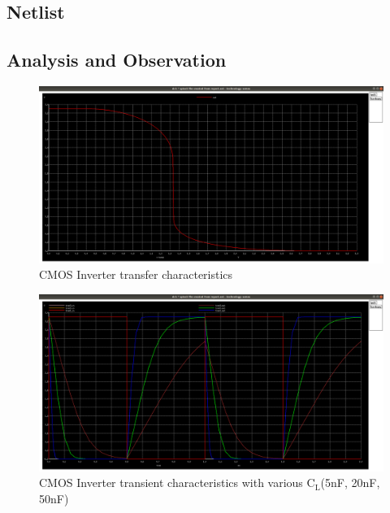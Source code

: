 \documentclass[12pt]{article}
\begin{document}
	\subsection{Netlist}
	
	\subsection{Analysis and Observation}
	\begin{figure}[H]
		\begin{center}
			\includegraphics[scale = 0.2]{images/layout_dc.png}
			\caption{CMOS Inverter transfer characteristics}
			\label{fig::layout_dc}
		\end{center}
	\end{figure}
	
	\begin{figure}[H]
		\begin{center}
			\includegraphics[scale = 0.2]{images/layout_tran_cl.png}
			\caption{CMOS Inverter transient characteristics with various $\text{C}_\text{L}$(5nF, 20nF, 50nF)}
			\label{fig::layout_tran}
		\end{center}
	\end{figure}
	
	
\end{document}
